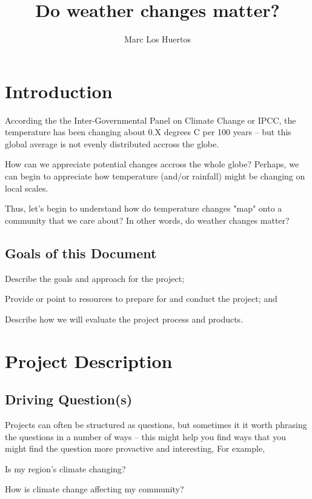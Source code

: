 \documentclass{article}\usepackage[]{graphicx}\usepackage[]{color}
\title{Do weather changes matter?}
\author{Marc Los Huertos}
\date{}
\newenvironment{itemize*}%
  {\begin{itemize}%
    \setlength{\itemsep}{0pt}%
    \setlength{\parskip}{0pt}}%
  {\end{itemize}}
\newenvironment{enumerate*}%
  {\begin{enumerate}%
    \setlength{\itemsep}{0pt}%
    \setlength{\parskip}{0pt}}%
  {\end{enumerate}}
\begin{document}
\maketitle

\section{Introduction}

According the the Inter-Governmental Panel on Climate Change or IPCC, the temperature has been changing about 0.X degrees C per 100 years -- but this global average is not evenly distributed accross the globe. 

How can we appreciate potential changes accross the whole globe?  Perhaps, we can begin to appreciate how temperature (and/or rainfall) might be changing on local scales.

Thus, let's begin to understand how do temperature changes "map" onto a community that we care about? In other words, do weather changes matter?

\subsection{Goals of this Document}

\begin{enumerate*}
  \item Describe the goals and approach for the project;
  \item Provide or point to resources to prepare for and conduct the project; and
  \item Describe how we will evaluate the project process and products.
\end{enumerate*}

\section{Project Description}

\subsection{Driving Question(s)}

Projects can often be structured as questions, but sometimes it it worth phrasing the questions in a number of ways -- this might help you find ways that you might find the question more provactive and interesting, For example,

\begin{itemize*}
  \item Is my region's climate changing?
  \item How is climate change affecting my community?
\end{itemize*}
\end{document}
